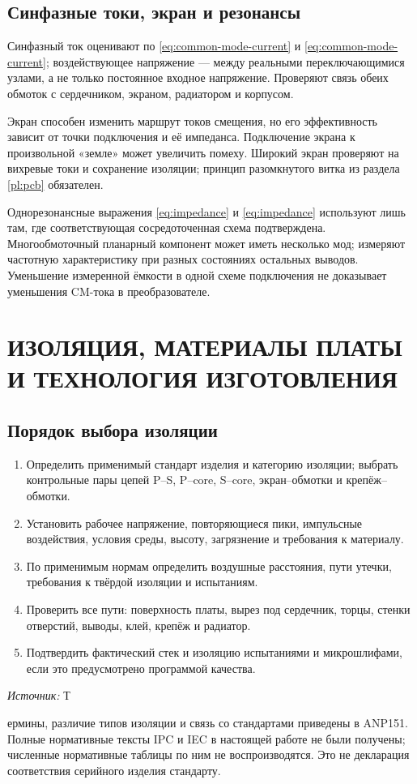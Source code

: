 \documentclass[14pt,a4paper]{extarticle}
\newcommand{\source}[1]{\par\noindent\textit{Источник:} #1\par}
\begin{document}
\subsection{Синфазные токи, экран и резонансы}
Синфазный ток оценивают по \eqref{eq:common-mode-current} и \eqref{eq:common-mode-current}; воздействующее напряжение --- между реальными переключающимися узлами, а не только постоянное входное напряжение. Проверяют связь обеих обмоток с сердечником, экраном, радиатором и корпусом.

Экран способен изменить маршрут токов смещения, но его эффективность зависит от точки подключения и её импеданса. Подключение экрана к произвольной «земле» может увеличить помеху. Широкий экран проверяют на вихревые токи и сохранение изоляции; принцип разомкнутого витка из раздела \ref{pl:pcb} обязателен.

Однорезонансные выражения \eqref{eq:impedance} и \eqref{eq:impedance} используют лишь там, где соответствующая сосредоточенная схема подтверждена. Многообмоточный планарный компонент может иметь несколько мод; измеряют частотную характеристику при разных состояниях остальных выводов. Уменьшение измеренной ёмкости в одной схеме подключения не доказывает уменьшения CM-тока в преобразователе.

\section{ИЗОЛЯЦИЯ, МАТЕРИАЛЫ ПЛАТЫ И ТЕХНОЛОГИЯ ИЗГОТОВЛЕНИЯ}
\label{pl:manufacturing}
\subsection{Порядок выбора изоляции}
\begin{enumerate}
\item Определить применимый стандарт изделия и категорию изоляции; выбрать контрольные пары цепей P--S, P--core, S--core, экран--обмотки и крепёж--обмотки.
\item Установить рабочее напряжение, повторяющиеся пики, импульсные воздействия, условия среды, высоту, загрязнение и требования к материалу.
\item По применимым нормам определить воздушные расстояния, пути утечки, требования к твёрдой изоляции и испытаниям.
\item Проверить все пути: поверхность платы, вырез под сердечник, торцы, стенки отверстий, выводы, клей, крепёж и радиатор.
\item Подтвердить фактический стек и изоляцию испытаниями и микрошлифами, если это предусмотрено программой качества.
\end{enumerate}
\source Термины, различие типов изоляции и связь со стандартами приведены в ANP151.\cite{web25} Полные нормативные тексты IPC и IEC в настоящей работе не были получены; численные нормативные таблицы по ним не воспроизводятся. Это не декларация соответствия серийного изделия стандарту.
\end{document}
